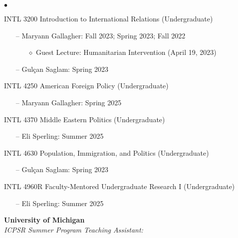 \documentclass[letterpaper,12pt]{article}
\newenvironment{list2}{
  \begin{list}{$\bullet$}{%
      \setlength{\itemsep}{0in}
      \setlength{\parsep}{0in} 
      \setlength{\parskip}{0in}
      \setlength{\topsep}{0in} 
      \setlength{\partopsep}{0in}
      \setlength{\leftmargin}{1in}
      \setlength{\labelsep}{1em}
      \setlength{\labelwidth}{1em}
      \setlength{\itemindent}{-2em}
      \setlength{\listparindent}{2em}}}{\end{list}}
\begin{document}
\begin{list2}
    \item INTL 3200 Introduction to International Relations (Undergraduate)
        \begin{enumerate}[leftmargin=!,labelindent=0pt,itemindent=-15pt]
            \item[--] Maryann Gallagher: Fall 2023; Spring 2023; Fall 2022
                    \begin{enumerate}[leftmargin=!,labelindent=0pt,itemindent=-30pt]
                        \item[$\diamond$] Guest Lecture: Humanitarian Intervention (April 19, 2023)
                    \end{enumerate}
            \item[--] Gulçan Saglam: Spring 2023
        \end{enumerate}
    \item INTL 4250 American Foreign Policy (Undergraduate)
        \begin{enumerate}[leftmargin=!,labelindent=0pt,itemindent=-15pt]
            \item[--] Maryann Gallagher: Spring 2025
        \end{enumerate}
    \item INTL 4370 Middle Eastern Politics (Undergraduate)
        \begin{enumerate}[leftmargin=!,labelindent=0pt,itemindent=-15pt]
            \item[--] Eli Sperling: Summer 2025
        \end{enumerate}
    \item INTL 4630 Population, Immigration, and Politics (Undergraduate)
        \begin{enumerate}[leftmargin=!,labelindent=0pt,itemindent=-15pt]
            \item[--] Gulçan Saglam: Spring 2023
        \end{enumerate}
    \item INTL 4960R Faculty-Mentored Undergraduate Research I (Undergraduate)
        \begin{enumerate}[leftmargin=!,labelindent=0pt,itemindent=-15pt]
            \item[--] Eli Sperling: Summer 2025
        \end{enumerate}
\end{list2}
\par
\textbf{University of Michigan}\\
\textit{ICPSR Summer Program Teaching Assistant:}
\end{document}
